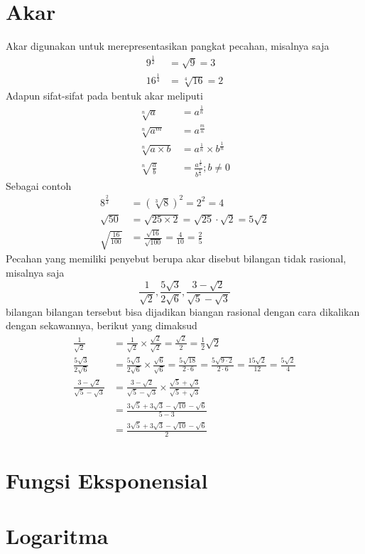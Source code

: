 \documentclass{article}
\begin{document}
\section{Akar}
Akar digunakan untuk merepresentasikan pangkat pecahan, misalnya saja
\[
\begin{aligned}
    9^{\frac{1}{2}} &= \sqrt{9} = 3\\
    16^{\frac{1}{4}} &= \sqrt[4]{16} = 2
\end{aligned}
\]
Adapun sifat-sifat pada bentuk akar meliputi
\[
\begin{aligned}
    \sqrt[n]{a} &= a^{\frac{1}{n}}\\
    \sqrt[n]{a^m} &= a^{\frac{m}{n}}\\
    \sqrt[n]{a \times b} &=a^{\frac{1}{n}} \times b^{\frac{1}{n}}\\
    \sqrt[n]{\frac{a}{b}} &=\frac{a^{\frac{1}{n}}}{b^{\frac{1}{n}}} ;b \neq 0
\end{aligned}
\]
Sebagai contoh 
\[
\begin{aligned}
    8^{\frac{2}{3}} &=(\sqrt[3]{8})^2 =2^2=4\\
    \sqrt{50}&=\sqrt{25 \times2}=\sqrt{25}\cdot\sqrt{2}=5\sqrt{2}\\
    \sqrt{\frac{16}{100}} &=\frac{\sqrt{16}}{\sqrt{100}}=\frac{4}{10}=\frac{2}{5}
\end{aligned}
\]
Pecahan yang memiliki penyebut berupa akar disebut bilangan tidak rasional, misalnya saja
\[
\frac{1}{\sqrt{2}},\frac{5\sqrt{3}}{2\sqrt{6}},\frac{3-\sqrt{2}}{\sqrt{5}-\sqrt{3}}
\]
bilangan bilangan tersebut bisa dijadikan biangan rasional dengan cara dikalikan dengan sekawannya, berikut yang dimaksud
\[
\begin{aligned}
    \frac{1}{\sqrt{2}} &= \frac{1}{\sqrt{2}} \times \frac{\sqrt{2}}{\sqrt{2}}=\frac{\sqrt{2}}{2}=\frac{1}{2}\sqrt{2}\\
    \frac{5\sqrt{3}}{2\sqrt{6}} &= \frac{5\sqrt{3}}{2\sqrt{6}} \times \frac{\sqrt{6}}{\sqrt{6}}=\frac{5\sqrt{18}}{2 \cdot 6}=\frac{5\sqrt{9\cdot 2}}{2 \cdot 6}=\frac{15\sqrt{2}}{12}=\frac{5\sqrt{2}}{4}\\
    \frac{3-\sqrt{2}}{\sqrt{5}-\sqrt{3}} &=\frac{3-\sqrt{2}}{\sqrt{5}-\sqrt{3}}\times \frac{\sqrt{5}+\sqrt{3}}{\sqrt{5}+\sqrt{3}}\\
    &=\frac{3\sqrt{5}+3\sqrt{3}-\sqrt{10}-\sqrt{6}}{5-3}\\
    &=\frac{3\sqrt{5}+3\sqrt{3}-\sqrt{10}-\sqrt{6}}{2}
\end{aligned}
\]
\section{Fungsi Eksponensial}
\section{Logaritma}
\end{document}
